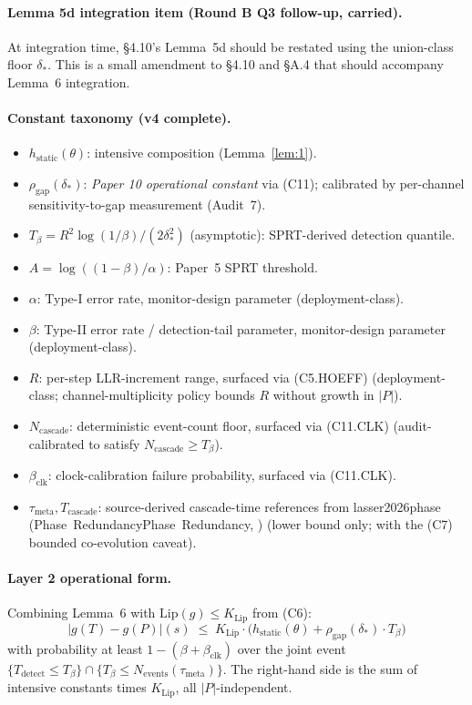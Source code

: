 \documentclass{article}
\makeatletter
\newcommand{\citep}[2][]{%
  \begingroup
  \def\@tmpkey{#2}%
  \ifx\@tmpkey\@empty\else
    (\ifx\@empty#1\@empty\else #1, \fi
     \@nameuse{bibkey@\@tmpkey})%
  \fi
  \endgroup
}
\newcommand{\deltastar}{\delta_{*}}
\newcommand{\rhogap}{\rho_{\mathrm{gap}}}
\newcommand{\Pproxy}{P}
\newcommand{\Ttruth}{T}
\newcommand{\Tbeta}{T_{\beta}}
\newcommand{\Ncasc}{N_{\mathrm{cascade}}}
\newcommand{\Nev}{N_{\mathrm{events}}}
\newcommand{\bclk}{\beta_{\mathrm{clk}}}
\makeatother
\begin{document}
\paragraph{Lemma 5d integration item (Round B Q3 follow-up,
carried).}
At integration time, §4.10's Lemma~5d should be restated using the
union-class floor $\deltastar$.  This is a small amendment to §4.10
and §A.4 that should accompany Lemma~6 integration.

\paragraph{Constant taxonomy (v4 complete).}
\begin{itemize}
\item $h_{\mathrm{static}}(\theta)$: intensive composition
  (Lemma~\ref{lem:1}).
\item $\rhogap(\deltastar)$: \emph{Paper 10 operational constant}
  via (C11); calibrated by per-channel sensitivity-to-gap
  measurement (Audit~7).
\item $\Tbeta = R^2 \log(1/\beta)/(2\deltastar^2)$ (asymptotic):
  SPRT-derived detection quantile.
\item $A = \log((1-\beta)/\alpha)$: Paper~5 SPRT threshold.
\item $\alpha$: Type-I error rate, monitor-design parameter
  (deployment-class).
\item $\beta$: Type-II error rate / detection-tail parameter,
  monitor-design parameter (deployment-class).
\item $R$: per-step LLR-increment range, surfaced via
  (C5.HOEFF) (deployment-class; channel-multiplicity policy bounds
  $R$ without growth in $|P|$).
\item $\Ncasc$: deterministic event-count floor, surfaced via
  (C11.CLK) (audit-calibrated to satisfy $\Ncasc \geq \Tbeta$).
\item $\bclk$: clock-calibration failure probability, surfaced via
  (C11.CLK).
\item $\tau_{\mathrm{meta}}, T_{\mathrm{cascade}}$: source-derived
  cascade-time references from
  \citep[Phase~Redundancy]{lasser2026phase} (lower bound only;
  with the (C7) bounded co-evolution caveat).
\end{itemize}

\paragraph{Layer 2 operational form.}
Combining Lemma~6 with $\mathrm{Lip}(g) \leq K_{\mathrm{Lip}}$ from
(C6):
\[
  |g(\Ttruth) - g(\Pproxy)|(s) \;\leq\; K_{\mathrm{Lip}} \cdot
  \bigl(h_{\mathrm{static}}(\theta) + \rhogap(\deltastar) \cdot
  \Tbeta\bigr)
\]
with probability at least $1 - (\beta + \bclk)$ over the joint
event $\{T_{\mathrm{detect}} \leq \Tbeta\} \cap \{\Tbeta \leq
\Nev(\tau_{\mathrm{meta}})\}$.  The right-hand side is the sum of
intensive constants times $K_{\mathrm{Lip}}$, all $|P|$-independent.
\end{document}
